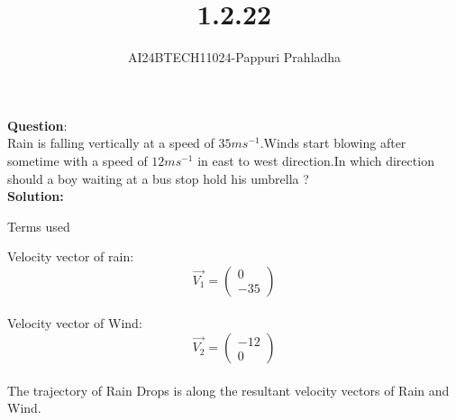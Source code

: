 \documentclass[journal]{IEEEtran}
\begin{document}

\vspace{3cm}

\title{1.2.22}
\author{AI24BTECH11024-Pappuri Prahladha}
{\let\newpage\relax\maketitle}

\renewcommand{\thefigure}{\theenumi}
\renewcommand{\thetable}{\theenumi}
\setlength{\intextsep}{10pt} %


\renewcommand{\thetable}{\theenumi}


\textbf{Question}:\\
Rain is falling vertically at a speed of $35ms^{-1}$.Winds start blowing after sometime with a speed of $12ms^{-1}$ in east to west direction.In which direction should a boy waiting at a bus stop hold his umbrella ?
\\
\textbf{Solution: }
\begin{table}[h!]
    \renewcommand{\thetable}{1}
    \centering
    
    \caption{Terms used}
    \label{TABLE 1:}
\end{table}


Velocity vector of rain:\\
\begin{equation}
\vec{V_{1}}=\begin{pmatrix}
0\\
-35
\end{pmatrix}
\end{equation}\\
Velocity vector of Wind:\\
\begin{equation}
\vec{V_{2}}=\begin{pmatrix}
-12\\
0
\end{pmatrix}
\end{equation}\\
The trajectory of Rain Drops is along the resultant velocity vectors of Rain and Wind.\\
\end{document}
